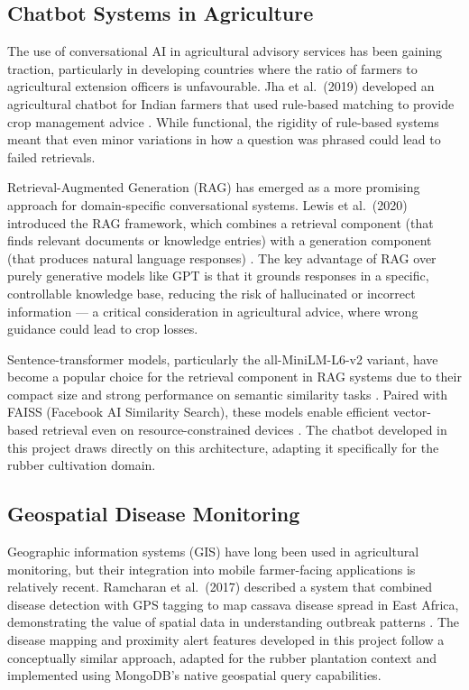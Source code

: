 \subsection{Chatbot Systems in Agriculture}

The use of conversational AI in agricultural advisory services has been gaining traction, particularly in developing countries where the ratio of farmers to agricultural extension officers is unfavourable. Jha et al.\ (2019) developed an agricultural chatbot for Indian farmers that used rule-based matching to provide crop management advice \cite{ref16}. While functional, the rigidity of rule-based systems meant that even minor variations in how a question was phrased could lead to failed retrievals.

Retrieval-Augmented Generation (RAG) has emerged as a more promising approach for domain-specific conversational systems. Lewis et al.\ (2020) introduced the RAG framework, which combines a retrieval component (that finds relevant documents or knowledge entries) with a generation component (that produces natural language responses) \cite{ref17}. The key advantage of RAG over purely generative models like GPT is that it grounds responses in a specific, controllable knowledge base, reducing the risk of hallucinated or incorrect information --- a critical consideration in agricultural advice, where wrong guidance could lead to crop losses.

Sentence-transformer models, particularly the all-MiniLM-L6-v2 variant, have become a popular choice for the retrieval component in RAG systems due to their compact size and strong performance on semantic similarity tasks \cite{ref18}. Paired with FAISS (Facebook AI Similarity Search), these models enable efficient vector-based retrieval even on resource-constrained devices \cite{ref19}. The chatbot developed in this project draws directly on this architecture, adapting it specifically for the rubber cultivation domain.

\subsection{Geospatial Disease Monitoring}

Geographic information systems (GIS) have long been used in agricultural monitoring, but their integration into mobile farmer-facing applications is relatively recent. Ramcharan et al.\ (2017) described a system that combined disease detection with GPS tagging to map cassava disease spread in East Africa, demonstrating the value of spatial data in understanding outbreak patterns \cite{ref20}. The disease mapping and proximity alert features developed in this project follow a conceptually similar approach, adapted for the rubber plantation context and implemented using MongoDB's native geospatial query capabilities.


